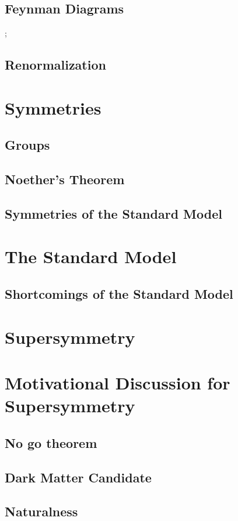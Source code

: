 \subsection{Feynman Diagrams}

;

\subsection{Renormalization}

\section{Symmetries}

\subsection{Groups}

\subsection{Noether's Theorem}

\subsection{Symmetries of the Standard Model}

\section{The Standard Model}

\subsection{Shortcomings of the Standard Model}

\section{Supersymmetry}

\section{Motivational Discussion for Supersymmetry}

\subsection{No go theorem}
\subsection{Dark Matter Candidate}
\subsection{Naturalness}


